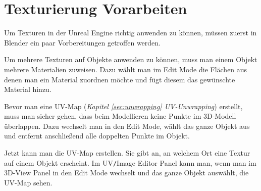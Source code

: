 \section{Texturierung Vorarbeiten}
Um Texturen in der Unreal Engine richtig anwenden zu können, müssen zuerst in Blender ein paar Vorbereitungen getroffen werden.

Um mehrere Texturen auf Objekte anwenden zu können, muss man einem Objekt mehrere Materialien zuweisen. Dazu wählt man im Edit Mode die Flächen aus denen man ein Material zuordnen
möchte und fügt diesem das gewünschte Material hinzu.

Bevor man eine UV-Map (\textit{Kapitel \ref{sec:unwrapping} UV-Unwrapping}) erstellt, muss man sicher gehen, dass beim Modellieren keine Punkte im 3D-Modell überlappen.
Dazu wechselt man in den Edit Mode, wählt das ganze Objekt aus und entfernt anschließend alle doppelten Punkte im Objekt.

Jetzt kann man die UV-Map erstellen. Sie gibt an, an welchem Ort eine Textur auf einem Objekt erscheint.
Im UV\verb-/-Image Editor Panel kann man, wenn man im 3D-View Panel in den Edit Mode
wechselt und das ganze Objekt auswählt, die UV-Map sehen.
